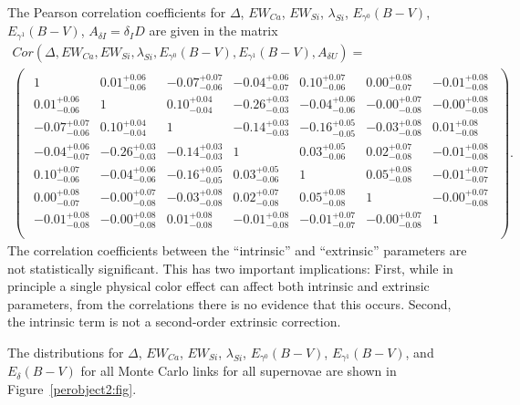\documentclass{aastex61}   	%
\begin{document}
The Pearson correlation coefficients for $\Delta$, $EW_{Ca}$, $EW_{Si}$, $\lambda_{Si}$, $E_{\gamma^0}(B-V)$, $E_{\gamma^1}(B-V)$,  $A_{\delta I}=\delta_I D$ are given in the matrix
\color{purple}
\begin{multline}
Cor(\Delta, EW_{Ca}, EW_{Si}, \lambda_{Si}, E_{\gamma^0}(B-V), E_{\gamma^1}(B-V),  A_{\delta U}) =\\
\begin{pmatrix}
\begin{array}{rrrrrrr}
1 & 0.01^{+0.06}_{-0.06} & -0.07^{+0.07}_{-0.06} & -0.04^{+0.06}_{-0.07} & 0.10^{+0.07}_{-0.06} & 0.00^{+0.08}_{-0.07} & -0.01^{+0.08}_{-0.08} \\
0.01^{+0.06}_{-0.06} & 1 & 0.10^{+0.04}_{-0.04} & -0.26^{+0.03}_{-0.03} & -0.04^{+0.06}_{-0.06} & -0.00^{+0.07}_{-0.08} & -0.00^{+0.08}_{-0.08} \\
-0.07^{+0.07}_{-0.06} & 0.10^{+0.04}_{-0.04} & 1 & -0.14^{+0.03}_{-0.03} & -0.16^{+0.05}_{-0.05} & -0.03^{+0.08}_{-0.08} & 0.01^{+0.08}_{-0.08} \\
-0.04^{+0.06}_{-0.07} & -0.26^{+0.03}_{-0.03} & -0.14^{+0.03}_{-0.03} & 1 & 0.03^{+0.05}_{-0.06} & 0.02^{+0.07}_{-0.08} & -0.01^{+0.08}_{-0.08} \\
0.10^{+0.07}_{-0.06} & -0.04^{+0.06}_{-0.06} & -0.16^{+0.05}_{-0.05} & 0.03^{+0.05}_{-0.06} & 1 & 0.05^{+0.08}_{-0.08} & -0.01^{+0.07}_{-0.07} \\
0.00^{+0.08}_{-0.07} & -0.00^{+0.07}_{-0.08} & -0.03^{+0.08}_{-0.08} & 0.02^{+0.07}_{-0.08} & 0.05^{+0.08}_{-0.08} & 1 & -0.00^{+0.07}_{-0.08} \\
-0.01^{+0.08}_{-0.08} & -0.00^{+0.08}_{-0.08} & 0.01^{+0.08}_{-0.08} & -0.01^{+0.08}_{-0.08} & -0.01^{+0.07}_{-0.07} & -0.00^{+0.07}_{-0.08} & 1 \\
\end{array}
\end{pmatrix}.
\end{multline}
\color{black}
The correlation coefficients between the ``intrinsic'' and ``extrinsic'' parameters are
\color{purple}
not statistically significant.
\color{black}
This has two important implications:
First, while in principle a single physical color effect can affect both intrinsic and extrinsic parameters, from the correlations
there is no evidence
that this occurs.
Second, the intrinsic term is not a second-order extrinsic correction.

The distributions for $\Delta$, $EW_{Ca}$, $EW_{Si}$, $\lambda_{Si}$, $E_{\gamma^0}(B-V)$, 
$E_{\gamma^1}(B-V)$, and
$E_{\delta}(B-V)$ for all Monte Carlo links for all supernovae are shown in Figure~\ref{perobject2:fig}.
\end{document}
